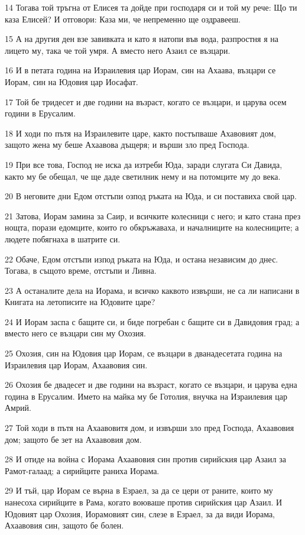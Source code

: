 \par 14 Тогава той тръгна от Елисея та дойде при господаря си и той му рече: Що ти каза Елисей? И отговори: Каза ми, че непременно ще оздравееш.
\par 15 А на другия ден взе завивката и като я натопи във вода, разпростня я на лицето му, така че той умря. А вместо него Азаил се възцари.
\par 16 И в петата година на Израилевия цар Иорам, син на Ахаава, възцари се Иорам, син на Юдовия цар Иосафат.
\par 17 Той бе тридесет и две години на възраст, когато се възцари, и царува осем години в Ерусалим.
\par 18 И ходи по пътя на Израилевите царе, както постъпваше Ахавовият дом, защото жена му беше Ахаавова дъщеря; и върши зло пред Господа.
\par 19 При все това, Господ не иска да изтреби Юда, заради слугата Си Давида, както му бе обещал, че ще даде светилник нему и на потомците му до века.
\par 20 В неговите дни Едом отстъпи озпод ръката на Юда, и си поставиха свой цар.
\par 21 Затова, Иорам замина за Саир, и всичките колесници с него; и като стана през нощта, порази едомците, които го обкръжаваха, и началниците на колесниците; а людете побягнаха в шатрите си.
\par 22 Обаче, Едом отстъпи изпод ръката на Юда, и остана независим до днес. Тогава, в същото време, отстъпи и Ливна.
\par 23 А останалите дела на Иорама, и всичко каквото извърши, не са ли написани в Книгата на летописите на Юдовите царе?
\par 24 И Иорам заспа с бащите си, и биде погребан с бащите си в Давидовия град; а вместо него се възцари син му Охозия.
\par 25 Охозия, син на Юдовия цар Иорам, се възцари в дванадесетата година на Израилевия цар Иорам, Ахаавовия син.
\par 26 Охозия бе двадесет и две години на възраст, когато се възцари, и царува една година в Ерусалим. Името на майка му бе Готолия, внучка на Израилевия цар Амрий.
\par 27 Той ходи в пътя на Ахаавовитя дом, и извърши зло пред Господа, Ахаавовия дом; защото бе зет на Ахаавовия дом.
\par 28 И отиде на война с Иорама Ахаавовия син против сирийския цар Азаил за Рамот-галаад; а сирийците раниха Иорама.
\par 29 И тъй, цар Иорам се върна в Езраел, за да се цери от раните, които му нанесоха сирийците в Рама, когато воюваше против сирийския цар Азаил. И Юдовият цар Охозия, Иорамовият син, слезе в Езраел, за да види Иорама, Ахаавовия син, защото бе болен.

